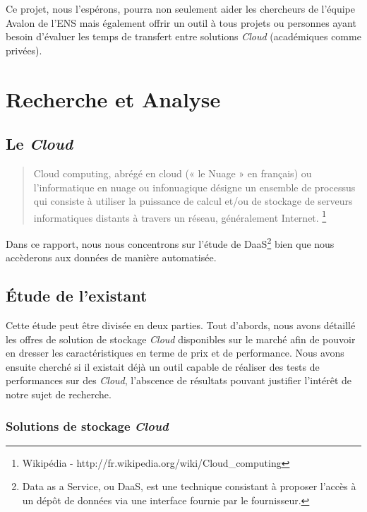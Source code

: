 \documentclass[10pt]{article}
\begin{document}
Ce projet, nous l’espérons, pourra non seulement aider les chercheurs de
l’équipe Avalon de l’ENS mais également offrir un outil à tous projets ou
personnes ayant besoin d’évaluer les temps de transfert entre solutions
\textit{Cloud} (académiques comme privées).


\section{Recherche et Analyse}

\subsection{Le \textit{Cloud}}

\begin{quote}
Cloud computing, abrégé en cloud (« le Nuage » en français) ou l’informatique en nuage ou infonuagique désigne un ensemble de processus qui consiste à utiliser la puissance de calcul et/ou de stockage de serveurs informatiques distants à travers un réseau, généralement Internet.
\footnote{Wikipédia - http://fr.wikipedia.org/wiki/Cloud\_computing}\\
\end{quote}

Dans ce rapport, nous nous concentrons sur l'étude de DaaS\footnote{Data as a Service, ou DaaS, est une technique consistant à proposer l'accès à un dépôt de données via une interface fournie par le fournisseur.} bien que nous accèderons aux données de manière automatisée.


\subsection{Étude de l'existant}


Cette étude peut être divisée en deux parties. Tout d’abords, nous avons
détaillé les offres de solution de stockage \textit{Cloud} disponibles sur le marché
afin de pouvoir en dresser les caractéristiques en terme de prix et de
performance.  Nous avons ensuite cherché si il existait déjà un outil capable
de réaliser des tests de performances sur des \textit{Cloud}, l'abscence de résultats
pouvant justifier l'intérêt de notre sujet de recherche.


\subsubsection{Solutions de stockage \textit{Cloud}}
\end{document}
